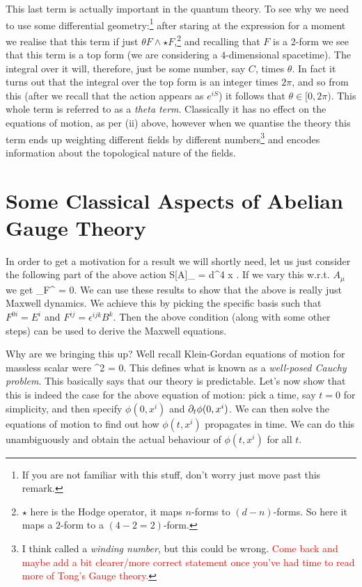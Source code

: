 \br 
    This last term is actually important in the quantum theory. To see why we need to use some differential geometry:\footnote{If you are not familiar with this stuff, don't worry just move past this remark.} after staring at the expression for a moment we realise that this term if just $\theta F\wedge \star F$,\footnote{$\star$ here is the Hodge operator, it maps $n$-forms to $(d-n)$-forms. So here it maps a $2$-form to a $(4-2=2)$-form.} and recalling that $F$ is a 2-form we see that this term is a top form (we are considering a $4$-dimensional spacetime). The integral over it will, therefore, just be some number, say $C$, times $\theta$. In fact it turns out that the integral over the top form is an integer times $2\pi$, and so from this (after we recall that the action appears as $e^{iS}$) it follows that $\theta \in [0,2\pi)$. This whole term is referred to as a \textit{theta term}. Classically it has no effect on the equations of motion, as per (ii) above, however when we quantise the theory this term ends up weighting different fields by different numbers\footnote{I think called a \textit{winding number}, but this could be wrong. \textcolor{red}{Come back and maybe add a bit clearer/more correct statement once you've had time to read more of Tong's Gauge theory.}} and encodes information about the topological nature of the fields. 
\er 

\section{Some Classical Aspects of Abelian Gauge Theory}

In order to get a motivation for a result we will shortly need, let us just consider the following part of the above action
\bse 
    S[A]_{} = \int d^4 x .
\ese 
If we vary this w.r.t. $A_{\mu}$ we get
\be 
\label{eqn:Feom}
    \p_{\mu}F^{\mu\nu} = 0.
\ee 
We can use these results to show that the above is really just Maxwell dynamics. We achieve this by picking the specific basis such that  $F^{0i}=E^i$ and $F^{ij} = \epsilon^{ijk} B^k$. Then the above condition (along with some other steps) can be used to derive the Maxwell equations. 

Why are we bringing this up? Well recall Klein-Gordan equations of motion for massless scalar were 
\bse 
    \p^2 \phi = 0.
\ese 
This defines what is known as a \textit{well-posed Cauchy problem}. This basically says that our theory is predictable. Let's now show that this is indeed the case for the above equation of motion: pick a time, say $t=0$ for simplicity, and then specify $\phi(0,x^i)$ and $\partial_t \phi(0,x^i)$. We can then solve the equations of motion to find out how $\phi(t,x^i)$ propagates in time. We can do this unambiguously and obtain the actual behaviour of $\phi(t,x^i)$ for all $t$. 

